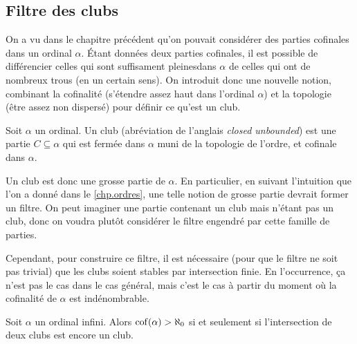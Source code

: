 \subsection{Filtre des clubs}

On a vu dans le chapitre précédent qu'on pouvait considérer des parties
cofinales dans un ordinal $\alpha$. \'Etant données deux parties cofinales,
il est possible de différencier celles qui sont \og suffisament pleines\fg dans
$\alpha$ de celles qui ont de nombreux trous (en un certain sens). On introduit
donc une nouvelle notion, combinant la cofinalité (s'étendre assez haut dans
l'ordinal $\alpha$) et la topologie (être assez non dispersé) pour définir ce
qu'est un club.

\begin{definition}[Club]
  Soit $\alpha$ un ordinal. Un club (abréviation de l'anglais
  \emph{closed unbounded}) est une partie $C\subseteq \alpha$ qui est fermée
  dans $\alpha$ muni de la topologie de l'ordre, et cofinale dans $\alpha$.
\end{definition}

Un club est donc une grosse partie de $\alpha$. En particulier, en suivant
l'intuition que l'on a donné dans le \cref{chp.ordres}, une telle notion de
grosse partie devrait former un filtre. On peut imaginer une partie contenant
un club mais n'étant pas un club, donc on voudra plutôt considérer le filtre
engendré par cette famille de parties.

Cependant, pour construire ce filtre, il est nécessaire (pour que le filtre ne
soit pas trivial) que les clubs soient stables par intersection finie. En
l'occurrence, ça n'est pas le cas dans le cas général, mais c'est le cas à
partir du moment où la cofinalité de $\alpha$ est indénombrable.

\begin{proposition}
  Soit $\alpha$ un ordinal infini. Alors $\operatorname{cof}(\alpha) > \aleph_0$ si et
  seulement si l'intersection de deux clubs est encore un club.
\end{proposition}


